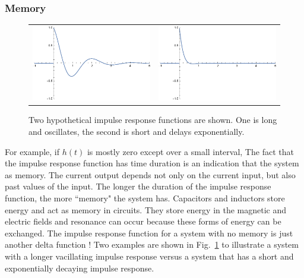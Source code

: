 \subsubsection{Memory}
\begin{figure}[tb]
\begin{tabular}{cc}
\includegraphics[width=.45\columnwidth]{impulse1_long.pdf} &
\includegraphics[width=.45\columnwidth]{impulse2_short.pdf} \\
\end{tabular}
\caption{Two hypothetical impulse response functions are shown.  One is long and oscillates, the second is short and delays exponentially.}
\label{fig:memory}
\end{figure}
For example, if $h(t)$ is mostly zero except over a small interval, 
The fact that the impulse response function has time duration is an indication that the system as memory.  The current output depends not only on the current input, but also past values of the input.  The longer the duration of the impulse response function, the more ``memory" the system has.  Capacitors and inductors store energy and act as memory in circuits.  They store energy in the magnetic and electric fields and resonance can occur because these forms of energy can be exchanged.  The impulse response function for a system with no memory is just another delta function !  Two examples are shown in Fig.~\ref{fig:memory} to illustrate a system with a longer vacillating impulse response versus a system that has a short and exponentially decaying impulse response.  
